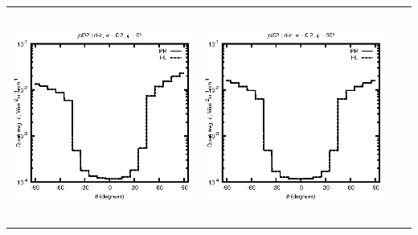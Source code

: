 \begin{tabular}{c c c c}
\includegraphics[height=7cm]{../eps/jol02_Ld_ir_fwd.eps} &
\includegraphics[height=7cm]{../eps/jol02_Ld_ir_cross.eps} \\
\end{tabular}

\pagebreak

